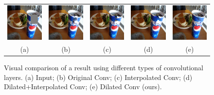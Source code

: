 \begin{figure}[!ht]
\centering
\small
\setlength\tabcolsep{1pt}
\begin{tabular}{ccccc}
\includegraphics[width=.2\textwidth]{figures/conv/000000311303_input_image.jpg}&
\includegraphics[width=.2\textwidth]{figures/conv/000000311303_synthesized_image.jpg}&
\includegraphics[width=.2\textwidth]{figures/conv/000000311303_synthesized_image-0.jpg}&
\includegraphics[width=.2\textwidth]{figures/conv/000000311303_synthesized_image-1.jpg}&
\includegraphics[width=.2\textwidth]{figures/conv/000000311303_synthesized_image_final.jpg}\\
(a) & (b) & (c) & (d) & (e)  \\
\end{tabular}
\caption{Visual comparison of a result using different types of convolutional layers. (a) Input; (b) Original Conv; (c) Interpolated Conv; (d) Dilated+Interpolated Conv; (e) Dilated Conv (ours).}
\label{fig:conv}
\end{figure}  

